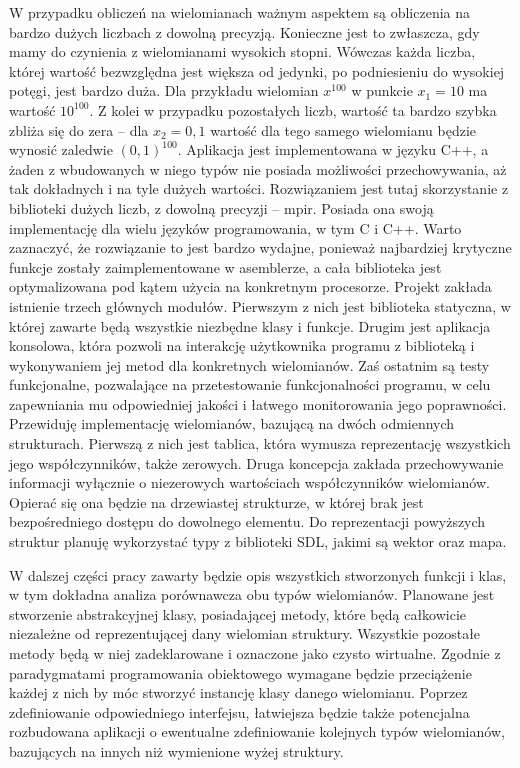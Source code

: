W przypadku obliczeń na wielomianach ważnym aspektem są obliczenia na bardzo dużych liczbach z dowolną precyzją. Konieczne jest to zwłaszcza, gdy mamy do czynienia z wielomianami wysokich stopni. Wówczas każda liczba, której wartość bezwzględna jest większa od jedynki, po podniesieniu do wysokiej potęgi, jest bardzo duża. Dla przykładu wielomian $x^{100}$ w punkcie $x_1=10$ ma wartość $10^{100}$. Z kolei w przypadku pozostałych liczb, wartość ta bardzo szybka zbliża się do zera – dla $x_2=0,1$ wartość dla tego samego wielomianu będzie wynosić zaledwie $(0,1)^{100}$. Aplikacja jest implementowana w języku C++, a żaden z wbudowanych w niego typów nie posiada możliwości przechowywania, aż tak dokładnych i na tyle dużych wartości. Rozwiązaniem jest tutaj skorzystanie z biblioteki dużych liczb, z dowolną precyzji – mpir. Posiada ona swoją implementację dla wielu języków programowania, w tym C i C++.  Warto zaznaczyć, że rozwiązanie to jest bardzo wydajne, ponieważ najbardziej krytyczne funkcje zostały zaimplementowane w asemblerze, a cała biblioteka jest optymalizowana pod kątem użycia na konkretnym procesorze.
Projekt zakłada istnienie trzech głównych modułów. Pierwszym z nich jest biblioteka statyczna, w której zawarte będą wszystkie niezbędne klasy i funkcje. Drugim jest aplikacja konsolowa, która pozwoli na interakcję użytkownika programu z biblioteką i wykonywaniem jej metod dla konkretnych wielomianów. Zaś ostatnim są testy funkcjonalne, pozwalające na przetestowanie funkcjonalności programu, w celu zapewniania mu odpowiedniej jakości i łatwego monitorowania jego poprawności.
Przewiduję implementację wielomianów, bazującą na dwóch odmiennych strukturach. Pierwszą z nich jest tablica, która wymusza reprezentację wszystkich jego współczynników, także zerowych. Druga koncepcja zakłada przechowywanie informacji wyłącznie o niezerowych wartościach  współczynników wielomianów. Opierać się ona będzie na drzewiastej strukturze, w której brak jest bezpośredniego dostępu do dowolnego elementu. Do reprezentacji powyższych struktur planuję wykorzystać typy z biblioteki SDL, jakimi są wektor oraz mapa.

W dalszej części pracy zawarty będzie opis wszystkich stworzonych funkcji i klas, w tym dokładna analiza porównawcza obu typów wielomianów. Planowane jest stworzenie abstrakcyjnej klasy, posiadającej metody, które będą całkowicie niezależne od reprezentującej dany wielomian struktury. Wszystkie pozostałe metody będą w niej zadeklarowane i oznaczone jako czysto wirtualne. Zgodnie z paradygmatami programowania obiektowego wymagane będzie przeciążenie każdej z nich by móc stworzyć instancję klasy danego wielomianu. Poprzez zdefiniowanie odpowiedniego interfejsu, łatwiejsza będzie także potencjalna rozbudowana aplikacji o ewentualne zdefiniowanie kolejnych typów wielomianów, bazujących na innych niż wymienione wyżej struktury.

